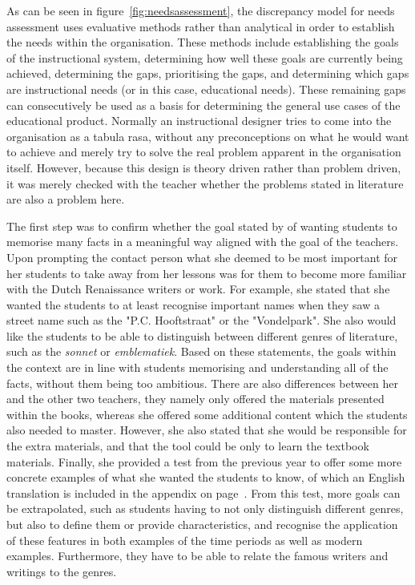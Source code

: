 As can be seen in figure~\ref{fig:needsassessment}, the discrepancy model for needs assessment uses evaluative methods rather than analytical in order to establish the needs within the organisation. These methods include establishing the goals of the instructional system, determining how well these goals are currently being achieved, determining the gaps, prioritising the gaps, and determining which gaps are instructional needs (or in this case, educational needs). These remaining gaps can consecutively be used as a basis for determining the general use cases of the educational product. Normally an instructional designer tries to come into the organisation as a tabula rasa, without any preconceptions on what he would want to achieve and merely try to solve the real problem apparent in the organisation itself. However, because this design is theory driven rather than problem driven, it was merely checked with the teacher whether the problems stated in literature are also a problem here.

The first step was to confirm whether the goal stated by  of wanting students to memorise many facts in a meaningful way aligned with the goal of the teachers. Upon prompting the contact person what she deemed to be most important for her students to take away from her lessons was for them to become more familiar with the Dutch Renaissance writers or work. For example, she stated that she wanted the students to at least recognise important names when they saw a street name such as the "P.C. Hooftstraat" or the "Vondelpark". She also would like the students to be able to distinguish between different genres of literature, such as the \emph{sonnet} or \emph{emblematiek}. Based on these statements, the goals within the context are in line with students memorising and understanding all of the facts, without them being too ambitious. There are also differences between her and the other two teachers, they namely only offered the materials presented within the books, whereas she offered some additional content which the students also needed to master. However, she also stated that she would be responsible for the extra materials, and that the tool could be only to learn the textbook materials. Finally, she provided a test from the previous year to offer some more concrete examples of what she wanted the students to know, of which an English translation is included in the appendix on page~\pageref{ch:exampletest}. From this test, more goals can be extrapolated, such as students having to not only distinguish different genres, but also to define them or provide characteristics, and recognise the application of these features in both examples of the time periods as well as modern examples. Furthermore, they have to be able to relate the famous writers and writings to the genres.

